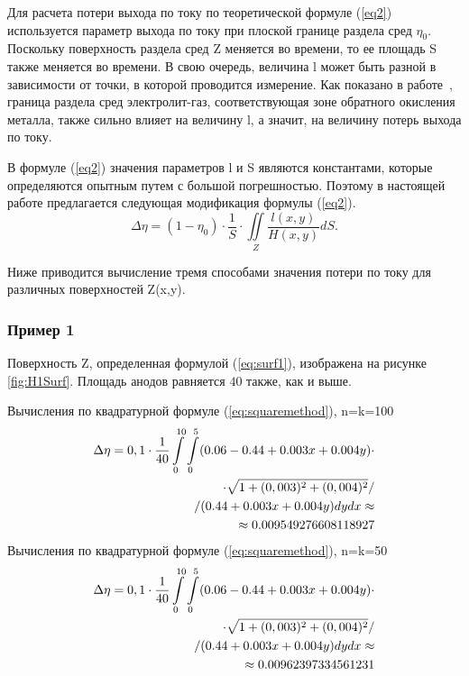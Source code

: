 \documentclass{article}
\begin{document}
Для расчета потери выхода по току по теоретической формуле (\ref{eq2}) используется параметр выхода по току при плоской границе раздела сред $\eta_0$. Поскольку поверхность раздела сред Z меняется во времени, то ее площадь S также меняется во времени. В свою очередь, величина l может быть разной в зависимости от точки, в которой проводится измерение. Как показано в работе~\cite{litlink:kalmykov}, граница раздела сред электролит-газ, соответствующая зоне обратного окисления металла, также сильно влияет на величину l, а значит, на величину потерь выхода по току.

В формуле (\ref{eq2}) значения параметров l и S являются константами, которые определяются опытным путем с большой погрешностью. Поэтому в настоящей работе предлагается следующая модификация формулы (\ref{eq2}).
\begin{equation} \label{eq:modeq2}
\Delta \eta = (1- \eta_0) \cdot \frac{1}{S} \cdot \iint\limits_Z \frac{l(x,y)}{H(x,y)}dS.
\end{equation}

Ниже приводится вычисление тремя способами значения потери по току для различных поверхностей Z(x,y).	%

\subsubsection*{Пример 1}

Поверхность Z, определенная формулой (\ref{eq:surf1}), изображена на рисунке \ref{fig:H1Surf}. Площадь анодов равняется $40$ также, как и выше.

Вычисления по квадратурной формуле (\ref{eq:squaremethod}), n=k=100
\begin{align}
\Delta \eta = 0,1 \cdot \frac{1}{40} \int\limits_0^{10} \int\limits_0^5 (0.06 - 0.44 + 0.003x + 0.004y) \cdot \notag \\
\cdot \sqrt{1+(0,003)^2+(0,004)^2}/ \notag \\ 
/(0.44 + 0.003x + 0.004y) dy dx \approx \notag \\ \approx 0.009549276608118927
\end{align}
Вычисления по квадратурной формуле (\ref{eq:squaremethod}), n=k=50
\begin{align}
\Delta \eta = 0,1 \cdot \frac{1}{40} \int\limits_0^{10} \int\limits_0^5 (0.06 - 0.44 + 0.003x + 0.004y) \cdot \notag \\
\cdot \sqrt{1+(0,003)^2+(0,004)^2}/ \notag \\ 
/(0.44 + 0.003x + 0.004y) dy dx \approx \notag \\ \approx 0.00962397334561231
\end{align}
\end{document}
